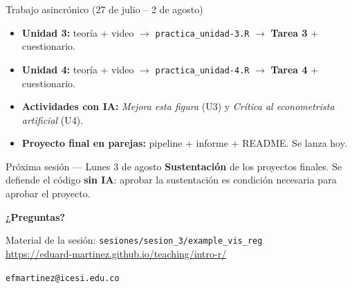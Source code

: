\documentclass[10pt]{beamer}
\begin{document}
\begin{frame}{Trabajo asincrónico (27 de julio -- 2 de agosto)}
  \begin{itemize}\setlength\itemsep{0.5em}
    \item \textbf{Unidad 3:} teoría + video $\rightarrow$ \texttt{practica\_unidad-3.R} $\rightarrow$ \textbf{Tarea 3} + cuestionario.
    \item \textbf{Unidad 4:} teoría + video $\rightarrow$ \texttt{practica\_unidad-4.R} $\rightarrow$ \textbf{Tarea 4} + cuestionario.
    \item \textbf{Actividades con IA:} \emph{Mejora esta figura} (U3) y \emph{Crítica al econometrista artificial} (U4).
    \item \textbf{Proyecto final en parejas:} pipeline + informe + README. Se lanza hoy.
  \end{itemize}
  \bigskip
  \begin{block}{Próxima sesión --- Lunes 3 de agosto}
    \textbf{Sustentación} de los proyectos finales. Se defiende el código \textbf{sin IA}: aprobar la sustentación es condición necesaria para aprobar el proyecto.
  \end{block}
\end{frame}

\begin{frame}
  \begin{center}
    {\Huge{}\textbf{¿Preguntas?}}
    \bigskip\bigskip

    Material de la sesión: \texttt{sesiones/sesion\_3/example\_vis\_reg}\\
    \url{https://eduard-martinez.github.io/teaching/intro-r/}
    \bigskip

    \texttt{efmartinez@icesi.edu.co}
  \end{center}
\end{frame}
\end{document}
